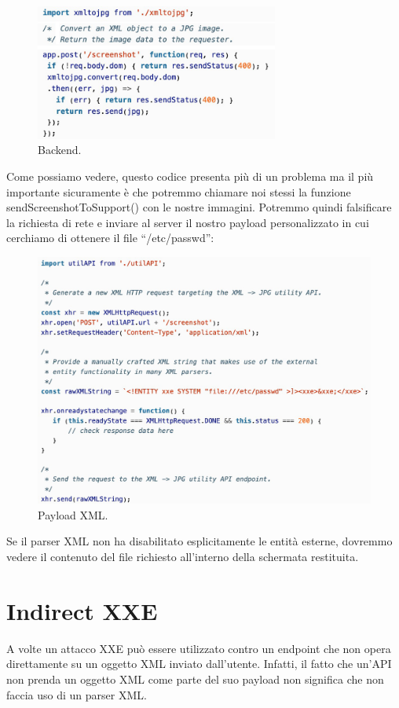 \begin{figure}[H]
	\centering
	\includegraphics[width=8cm, keepaspectratio]{capitoli/web_security/imgs/xxe_banca_4.png}
	\caption{Backend.}
	\label{fig:xxe_banca_4}
\end{figure}

Come possiamo vedere, questo codice presenta più di un problema ma il più importante sicuramente è che potremmo chiamare noi stessi la funzione sendScreenshotToSupport() con le nostre immagini. Potremmo quindi falsificare la richiesta di rete e inviare al server il nostro payload personalizzato in cui cerchiamo di ottenere il file ``/etc/passwd'':
\begin{figure}[H]
	\centering
	\includegraphics[width=12cm, keepaspectratio]{capitoli/web_security/imgs/xxe_banca_5.png}
	\caption{Payload XML.}
	\label{fig:xxe_banca_5}
\end{figure}

Se il parser XML non ha disabilitato esplicitamente le entità esterne, dovremmo vedere il contenuto del file richiesto all'interno della schermata restituita.

\newpage

\section{Indirect XXE}
A volte un attacco XXE può essere utilizzato contro un
endpoint che non opera direttamente su un oggetto XML
inviato dall'utente. Infatti, il fatto che un'API non prenda un oggetto XML come parte del suo payload non significa che non faccia uso di un parser XML.\\


